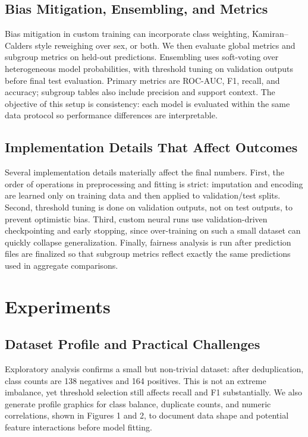 ﻿\documentclass[11pt]{article}
\begin{document}
\subsection{Bias Mitigation, Ensembling, and Metrics}
Bias mitigation in custom training can incorporate class weighting, Kamiran--Calders style reweighing over sex, or both. We then evaluate global metrics and subgroup metrics on held-out predictions. Ensembling uses soft-voting over heterogeneous model probabilities, with threshold tuning on validation outputs before final test evaluation. Primary metrics are ROC-AUC, F1, recall, and accuracy; subgroup tables also include precision and support context. The objective of this setup is consistency: each model is evaluated within the same data protocol so performance differences are interpretable.

\subsection{Implementation Details That Affect Outcomes}
Several implementation details materially affect the final numbers. First, the order of operations in preprocessing and fitting is strict: imputation and encoding are learned only on training data and then applied to validation/test splits. Second, threshold tuning is done on validation outputs, not on test outputs, to prevent optimistic bias. Third, custom neural runs use validation-driven checkpointing and early stopping, since over-training on such a small dataset can quickly collapse generalization. Finally, fairness analysis is run after prediction files are finalized so that subgroup metrics reflect exactly the same predictions used in aggregate comparisons.

\section{Experiments}
\subsection{Dataset Profile and Practical Challenges}
Exploratory analysis confirms a small but non-trivial dataset: after deduplication, class counts are 138 negatives and 164 positives. This is not an extreme imbalance, yet threshold selection still affects recall and F1 substantially. We also generate profile graphics for class balance, duplicate counts, and numeric correlations, shown in Figures 1 and 2, to document data shape and potential feature interactions before model fitting.
\end{document}
